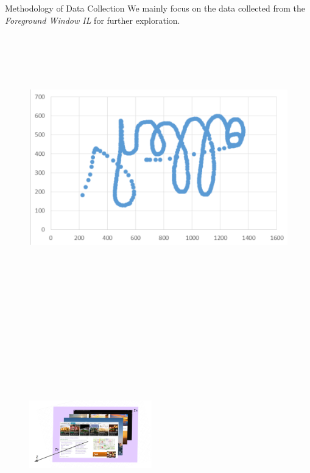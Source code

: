 \documentclass[final]{beamer}
\newlength{\colwidth}
\begin{document}
\begin{frame}[t]
\begin{columns}[t]
\begin{column}{\colwidth}
\begin{alertblock}{\LARGE{Methodology of Data Collection}}
{          We mainly focus on the data collected from the \textit{Foreground Window IL} for further exploration. }
        \begin{figure}
          \includegraphics[width=0.475 \textwidth, height=11.5cm]{mouse_movement.png}
          \hspace{\fill}
          \includegraphics[width=0.475\textwidth, height=11.5cm]{foreground_desktopMapper.PNG}
        \end{figure}
      \end{alertblock}


\end{column}
\end{columns}
\end{frame}
\end{document}
